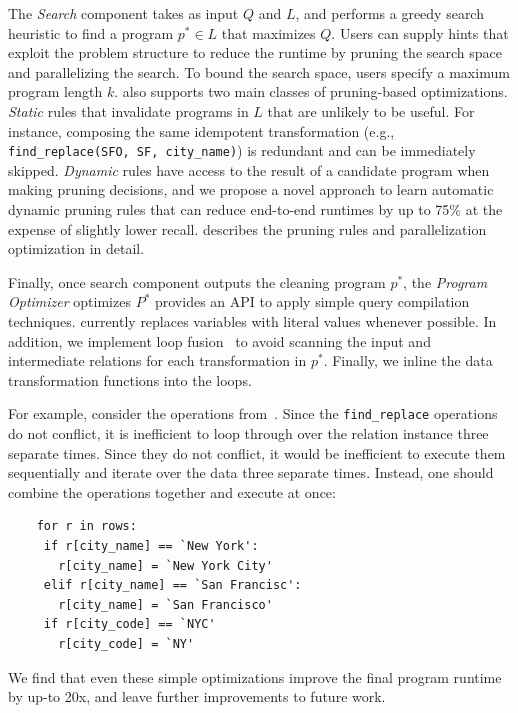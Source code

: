 The {\it Search} component takes as input $Q$ and $L$, and performs a greedy search heuristic to find a program $p^* \in L$ that maximizes $Q$.  Users can supply hints that exploit the problem structure to reduce the runtime by pruning the search space and parallelizing the search.  To bound the search space, users specify a maximum program length $k$.    \sys also supports two main classes of pruning-based optimizations. {\it Static} rules that invalidate programs in $L$ that are unlikely to be useful.  For instance, composing the same idempotent transformation (e.g., \texttt{find\_replace(SFO, SF, city\_name)}) is redundant and can be immediately skipped.  {\it Dynamic} rules have access to the result of a candidate program when making pruning decisions, and we propose a novel approach to learn automatic dynamic pruning rules that can reduce end-to-end runtimes by up to 75\% at the expense of slightly lower recall.   describes the pruning rules and parallelization optimization in detail.


Finally, once search component outputs the cleaning program $p^*$, the {\it Program Optimizer} optimizes $P^*$ provides an API to apply simple query compilation techniques.  \sys currently replaces variables with literal values whenever possible.  In addition, we implement loop fusion~\cite{} to avoid scanning the input and intermediate relations for each transformation in $p^*$. Finally, we inline the data transformation functions into the loops.    

For example, consider the operations from~.  Since the \texttt{find\_replace} operations do not conflict, it is inefficient to loop through over the relation instance three separate times.  
Since they do not conflict, it would be inefficient to execute them sequentially and iterate over the data three separate times.
Instead, one should combine the operations together and execute at once:
\begin{lstlisting}
    for r in rows:
     if r[city_name] == `New York':
       r[city_name] = `New York City'
     elif r[city_name] == `San Francisc':
       r[city_name] = `San Francisco'
     if r[city_code] == `NYC'
       r[city_code] = `NY'
\end{lstlisting}
We find that even these simple optimizations improve the final program runtime by up-to 20x, and leave further improvements to future work.





